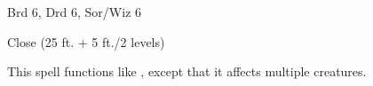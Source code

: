 
\begin{description*}
\item[Level:] Brd 6, Drd 6, Sor/Wiz 6
\item[Range:] Close (25 ft. + 5 ft./2 levels)
\end{description*}

This spell functions like , except that it affects multiple
creatures.